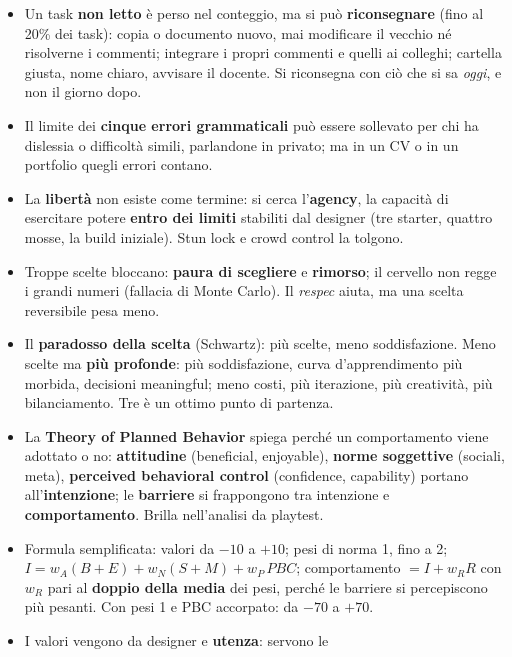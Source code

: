 \begin{itemize}
  \item Un task \textbf{non letto} è perso nel conteggio, ma si può
        \textbf{riconsegnare} (fino al 20\% dei task): copia o documento
        nuovo, mai modificare il vecchio né risolverne i commenti; integrare
        i propri commenti e quelli ai colleghi; cartella giusta, nome
        chiaro, avvisare il docente. Si riconsegna con ciò che si sa
        \emph{oggi}, e non il giorno dopo.
  \item Il limite dei \textbf{cinque errori grammaticali} può essere
        sollevato per chi ha dislessia o difficoltà simili, parlandone in
        privato; ma in un CV o in un portfolio quegli errori contano.
  \item La \textbf{libertà} non esiste come termine: si cerca
        l'\textbf{agency}, la capacità di esercitare potere \textbf{entro
        dei limiti} stabiliti dal designer (tre starter, quattro mosse, la
        build iniziale). Stun lock e crowd control la tolgono.
  \item Troppe scelte bloccano: \textbf{paura di scegliere} e
        \textbf{rimorso}; il cervello non regge i grandi numeri (fallacia di
        Monte Carlo). Il \emph{respec} aiuta, ma una scelta reversibile pesa
        meno.
  \item Il \textbf{paradosso della scelta} (Schwartz): più scelte, meno
        soddisfazione. Meno scelte ma \textbf{più profonde}: più soddisfazione,
        curva d'apprendimento più morbida, decisioni meaningful; meno costi,
        più iterazione, più creatività, più bilanciamento. Tre è un ottimo
        punto di partenza.
  \item La \textbf{Theory of Planned Behavior} spiega perché un
        comportamento viene adottato o no: \textbf{attitudine} (beneficial,
        enjoyable), \textbf{norme soggettive} (sociali, meta),
        \textbf{perceived behavioral control} (confidence, capability)
        portano all'\textbf{intenzione}; le \textbf{barriere} si frappongono
        tra intenzione e \textbf{comportamento}. Brilla nell'analisi da
        playtest.
  \item Formula semplificata: valori da $-10$ a $+10$; pesi di norma 1,
        fino a 2; $I = w_A(B+E) + w_N(S+M) + w_P\,\mathit{PBC}$; comportamento
        $= I + w_R R$ con $w_R$ pari al \textbf{doppio della media} dei
        pesi, perché le barriere si percepiscono più pesanti. Con pesi 1 e
        PBC accorpato: da $-70$ a $+70$.
  \item I valori vengono da designer e \textbf{utenza}: servono le

\end{itemize}
